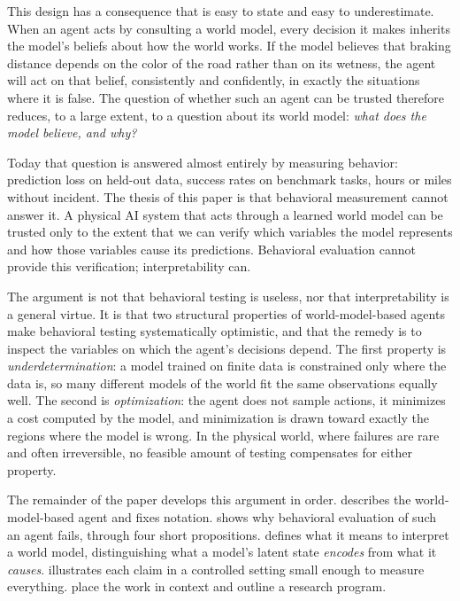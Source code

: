 \documentclass[11pt]{article}
\theoremstyle{definition}\newtheorem{definition}{Definition}
\begin{document}
This design has a consequence that is easy to state and easy to underestimate. When an agent acts by consulting a world model, every decision it makes inherits the model's beliefs about how the world works. If the model believes that braking distance depends on the color of the road rather than on its wetness, the agent will act on that belief, consistently and confidently, in exactly the situations where it is false. The question of whether such an agent can be trusted therefore reduces, to a large extent, to a question about its world model: \emph{what does the model believe, and why?}

Today that question is answered almost entirely by measuring behavior: prediction loss on held-out data, success rates on benchmark tasks, hours or miles without incident. The thesis of this paper is that behavioral measurement cannot answer it. A physical AI system that acts through a learned world model can be trusted only to the extent that we can verify which variables the model represents and how those variables cause its predictions. Behavioral evaluation cannot provide this verification; interpretability can.

The argument is not that behavioral testing is useless, nor that interpretability is a general virtue. It is that two structural properties of world-model-based agents make behavioral testing systematically optimistic, and that the remedy is to inspect the variables on which the agent's decisions depend. The first property is \emph{underdetermination}: a model trained on finite data is constrained only where the data is, so many different models of the world fit the same observations equally well. The second is \emph{optimization}: the agent does not sample actions, it minimizes a cost computed by the model, and minimization is drawn toward exactly the regions where the model is wrong. In the physical world, where failures are rare and often irreversible, no feasible amount of testing compensates for either property.

The remainder of the paper develops this argument in order.  describes the world-model-based agent and fixes notation.  shows why behavioral evaluation of such an agent fails, through four short propositions.  defines what it means to interpret a world model, distinguishing what a model's latent state \emph{encodes} from what it \emph{causes}.  illustrates each claim in a controlled setting small enough to measure everything.  place the work in context and outline a research program.
\end{document}
